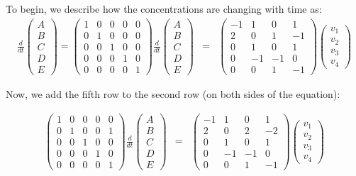 \documentclass{article}
\begin{document}
To begin, we describe how the concentrations are changing with time as:
\begin{eqnarray*}
\frac{d}{dt} \begin{pmatrix} A\\ B \\ C\\ D\\ E \end{pmatrix} = 
\begin{pmatrix} 1 & 0 & 0 & 0 & 0\\ 0 & 1 & 0 & 0 &0\\ 0 & 0 & 1 & 0 & 0\\ 0 & 0 & 0& 1 & 0\\ 0 & 0 & 0 & 0 & 1\end{pmatrix}
\frac{d}{dt} \begin{pmatrix} A\\ B \\ C\\ D\\ E \end{pmatrix} 
& = & \begin{pmatrix} -1 & 1 & 0 & 1\\
2 & 0 & 1 & -1\\
0 & 1 & 0 & 1\\
0 & -1 & -1 & 0\\
0 & 0 & 1 & -1
\end{pmatrix} \begin{pmatrix} v_1\\ v_2 \\ v_3 \\ v_4 \end{pmatrix}
\end{eqnarray*}

Now, we add the fifth row to the second row (on both sides of the equation):

\begin{eqnarray*}
\begin{pmatrix} 1 & 0 & 0 & 0 & 0\\ 0 & 1 & 0 & 0 &1\\ 0 & 0 & 1 & 0 & 0\\ 0 & 0 & 0& 1 & 0\\ 0 & 0 & 0 & 0 & 1\end{pmatrix}
\frac{d}{dt} \begin{pmatrix} A\\ B \\ C\\ D\\ E \end{pmatrix} 
& = & \begin{pmatrix} -1 & 1 & 0 & 1\\
2 & 0 & 2 & -2\\
0 & 1 & 0 & 1\\
0 & -1 & -1 & 0\\
0 & 0 & 1 & -1
\end{pmatrix} \begin{pmatrix} v_1\\ v_2 \\ v_3 \\ v_4 \end{pmatrix}
\end{eqnarray*}
\end{document}
